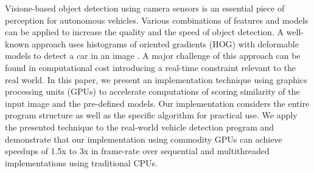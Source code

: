 Visione-based object detection using camera sensors is an essential piece
of perception for autonomous vehicles.
Various combinations of features and models can be applied to increase
the quality and the speed of object detection.
A well-known approach uses histograms of oriented gradients (HOG)
with deformable models to detect a car in an image \cite{Niknejad12}.
A major challenge of this approach can be found in computational cost
introducing a real-time constraint relevant to the real world.
In this paper, we present an implementation technique using graphics
processing units (GPUs) to accelerate computations of scoring similarity
of the input image and the pre-defined models.
Our implementation considers the entire program structure as well as the
specific algorithm for practical use.
We apply the presented technique to the real-world vehicle detection
program and demonstrate that our implementation using commodity
GPUs can achieve speedups of 1.5x to 3x in frame-rate over sequential
and multithreaded implementations using traditional CPUs.